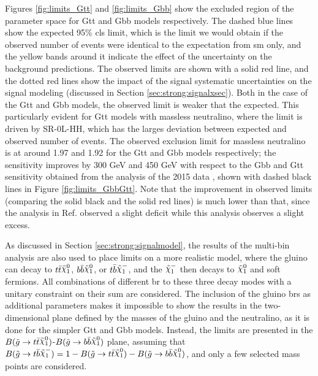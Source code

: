Figures \ref{fig:limits_Gtt} and \ref{fig:limits_Gbb} show the excluded region of the parameter space for Gtt and Gbb models 
respectively. The dashed blue lines show the expected 95\% \gls{cls} limit, which is the limit we would obtain if the observed number of 
events were identical to the expectation from \gls{sm} only, and the yellow bands around it indicate the effect of the 
uncertainty on the background predictions. The observed limits are shown with a solid red line, and the dotted red lines show the impact 
of the signal systematic uncertainties on the signal modeling (discussed in Section \ref{sec:strong:signalxsec}). 
Both in the case of the Gtt and Gbb models, the observed limit is weaker that the expected. 
This particularly evident for Gtt models with massless neutralino, where the limit is driven by SR-0L-HH, which has the larges deviation 
between expected and observed number of events.
The observed exclusion limit for massless neutralino is at around 1.97 and 1.92 for the Gtt and Gbb models respectively;
the sensitivity improves by 300 GeV and 450 GeV with respect to the Gbb and Gtt sensitivity obtained from the analysis of the 
2015 data \cite{Aad:2016eki}, shown with dashed black lines in Figure \ref{fig:limits_GbbGtt}. 
Note that the improvement in observed limits 
(comparing the solid black and the solid red lines) is much lower than that, since the analysis in Ref. \cite{Aad:2016eki}
observed a slight deficit while this analysis observes a slight excess. 

As discussed in Section \ref{sec:strong:signalmodel}, the results of the multi-bin analysis are also used to place 
limits on a more realistic model, where the gluino can decay to $ t \bar{t} \ninoone$, $ b \bar{b} \ninoone$, 
or $t \bar{b} \chinoonem$, and the $\chinoonem$ then decays to $\ninoone$ and soft fermions. All combinations of different \gls{br}
to these three decay modes with a unitary constraint on their sum are considered. 
The inclusion of the gluino \glspl{br} as additional parameters makes it impossible to show the results in the two-dimensional plane
defined by the masses of the gluino and the neutralino, as it is done for the simpler Gtt and Gbb models.
Instead, the limits are presented in the $B(\gluino \to t \bar{t} \ninoone)$-$B(\gluino \to b \bar{b} \ninoone)$ plane, 
assuming that $B(\gluino \to t \bar{b} \chinoonem) = 1 - B(\gluino \to t \bar{t} \ninoone) - B(\gluino \to b \bar{b} \ninoone)$, 
and only a few selected mass points are considered.  

